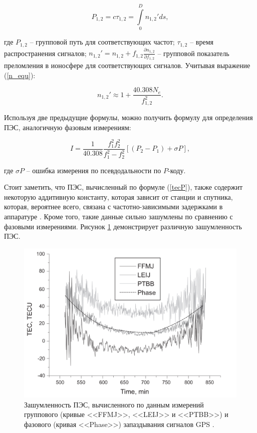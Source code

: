 \documentclass[a4paper]{article}
\begin{document}
\begin{equation}
P_{1,2} = c \tau_{1,2} = \int \limits_{0}^{D} n_{1,2}' ds,
\end{equation}

где $P_{1,2}$ -- групповой путь для соответствующих частот; $\tau_{1,2}$ -- время распространения сигналов; 
$n_{1,2}' = n_{1,2} + f_{1,2} \frac{\partial n_{1,2}}{\partial f_{1,2}}$ -- групповой показатель преломления в ионосфере для соответствующих сигналов. Учитывая выражение (\ref{n_equ}):

\begin{equation}
n_{1,2}' \approx 1 + \frac{40.308 N_e}{f_{1,2}^2}.
\end{equation}

Используя две предыдущие формулы, можно получить формулу для определения ПЭС, аналогичную фазовым измерениям:

\begin{equation}
\label{tecP}
I = \frac{1}{40.308} \frac{f_1^2 f_2^2}{f_1^2 - f_2^2} \left[ \left( P_2 - P_1 \right) + \sigma P \right],
\end{equation} 

где $\sigma P $ -- ошибка измерения по псевдодальности по $P$-коду.

Стоит заметить, что ПЭС, вычисленный по формуле (\ref{tecP}), также содержит некоторую аддитивную константу, которая зависит от станции и спутника, которая, вероятнее всего, связана с частотно-зависимыми задержками в аппаратуре \cite{kozharin}. Кроме того, такие данные сильно зашумлены по сравнению с фазовыми измерениями. Рисунок \ref{pic2} демонстрирует различную зашумленность ПЭС. 

\begin{figure}[h]
\centering
\includegraphics[width = 1\linewidth]{pics/pic2.png}
\caption{Зашумленность ПЭС, вычисленного по данным измерений группового (кривые <<FFMJ>>, <<LEIJ>> и <<PTBB>>) и фазового (кривая <<Phase>>) запаздывания сигналов GPS \cite{kozharin}.}
\label{pic2}
\end{figure}
\end{document}

